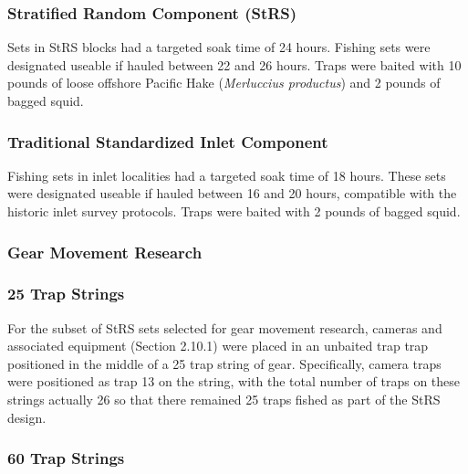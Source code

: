 \documentclass[12pt]{article}\usepackage[]{graphicx}\usepackage[]{color}
\begin{document}
\hypertarget{stratified-random-component-strs}{%
\subsubsection{Stratified Random Component (StRS)}\label{stratified-random-component-strs}}

Sets in StRS blocks had a targeted soak time of 24 hours. Fishing sets were designated useable if hauled between 22 and 26 hours. Traps were baited with 10 pounds of loose offshore Pacific Hake (\emph{Merluccius productus}) and 2 pounds of bagged squid.

\hypertarget{traditional-standardized-inlet-component}{%
\subsubsection{Traditional Standardized Inlet Component}\label{traditional-standardized-inlet-component}}

Fishing sets in inlet localities had a targeted soak time of 18 hours. These sets were designated useable if hauled between 16 and 20 hours, compatible with the historic inlet survey protocols. Traps were baited with 2 pounds of bagged squid.

\hypertarget{gear-movement-research-1}{%
\subsubsection{Gear Movement Research}\label{gear-movement-research-1}}

\hypertarget{trap-strings}{%
\subsubsection{25 Trap Strings}\label{trap-strings}}

For the subset of StRS sets selected for gear movement research, cameras and associated equipment (Section 2.10.1) were placed in an unbaited trap trap positioned in the middle of a 25 trap string of gear. Specifically, camera traps were positioned as trap 13 on the string, with the total number of traps on these strings actually 26 so that there remained 25 traps fished as part of the StRS design.

\hypertarget{trap-strings-1}{%
\subsubsection{60 Trap Strings}\label{trap-strings-1}}
\end{document}
